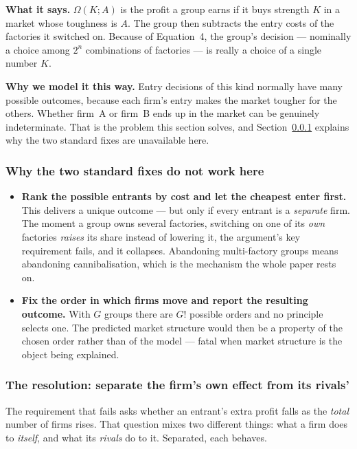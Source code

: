 \documentclass[11pt]{article}
\newcommand{\says}[1]{\smallskip\noindent\textbf{What it says.} #1\smallskip}
\newcommand{\why}[1]{\smallskip\noindent\textbf{Why we model it this way.} #1\smallskip}
\theoremstyle{plain}
\theoremstyle{remark}
\theoremstyle{definition}
\begin{document}
\says{$\Omega(K;A)$ is the profit a group earns if it buys strength $K$ in a market
whose toughness is $A$. The group then subtracts the entry costs of the factories it
switched on. Because of Equation~4, the group's decision --- nominally a choice among
$2^n$ combinations of factories --- is really a choice of a single number $K$.}

\why{Entry decisions of this kind normally have many possible outcomes, because each
firm's entry makes the market tougher for the others. Whether firm~A or firm~B ends up
in the market can be genuinely indeterminate. That is the problem this section solves,
and Section~\ref{sec:whyhard} explains why the two standard fixes are unavailable
here.}

\subsubsection{Why the two standard fixes do not work here}
\label{sec:whyhard}

\begin{itemize}
\item \textbf{Rank the possible entrants by cost and let the cheapest enter first.}
This delivers a unique outcome --- but only if every entrant is a \emph{separate}
firm. The moment a group owns several factories, switching on one of its \emph{own}
factories \emph{raises} its share instead of lowering it, the argument's key
requirement fails, and it collapses. Abandoning multi-factory groups means abandoning
cannibalisation, which is the mechanism the whole paper rests on.
\item \textbf{Fix the order in which firms move and report the resulting outcome.}
With $G$ groups there are $G!$ possible orders and no principle selects one. The
predicted market structure would then be a property of the chosen order rather than of
the model --- fatal when market structure is the object being explained.
\end{itemize}

\subsubsection{The resolution: separate the firm's own effect from its rivals'}

The requirement that fails asks whether an entrant's extra profit falls as the
\emph{total} number of firms rises. That question mixes two different things: what a
firm does to \emph{itself}, and what its \emph{rivals} do to it. Separated, each
behaves.
\end{document}
